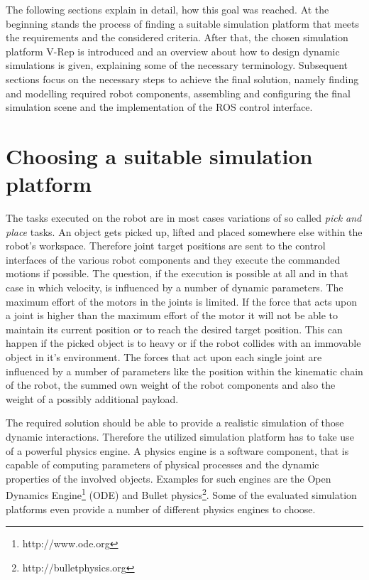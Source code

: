 The following sections explain in detail, how this goal was reached. At the beginning stands the process of finding a suitable simulation platform that meets the requirements and the considered criteria. After that, the chosen simulation platform V-Rep is introduced and an overview about how to design dynamic simulations is given, explaining some of the necessary terminology. Subsequent sections focus on the necessary steps to achieve the final solution, namely finding and modelling required robot components, assembling and configuring the final simulation scene and the implementation of the ROS control interface.

\section{Choosing a suitable simulation platform}

The tasks executed on the robot are in most cases variations of so called \emph{pick and place} tasks. An object gets picked up, lifted and placed somewhere else within the robot's workspace. Therefore joint target positions are sent to the control interfaces of the various robot components and they execute the commanded motions if possible. The question, if the execution is possible at all and in that case in which velocity, is influenced by a number of dynamic parameters. The maximum effort of the motors in the joints is limited. If the force that acts upon a joint is higher than the maximum effort of the motor it will not be able to maintain its current position or to reach the desired target position. This can happen if the picked object is to heavy or if the robot collides with an immovable object in it's environment. The forces that act upon each single joint are influenced by a number of parameters like the position within the kinematic chain of the robot, the summed own weight of the robot components and also the weight of a possibly additional payload.

The required solution should be able to provide a realistic simulation of those dynamic interactions. Therefore the utilized simulation platform has to take use of a powerful physics engine. A physics engine is a software component, that is capable of computing parameters of physical processes and the dynamic properties of the involved objects. Examples for such engines are the Open Dynamics Engine\footnote{http://www.ode.org} (ODE) and Bullet physics\footnote{http://bulletphysics.org}. Some of the evaluated simulation platforms even provide a number of different physics engines to choose.\\

